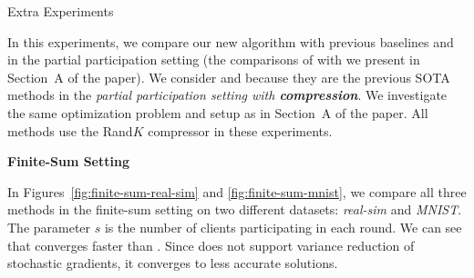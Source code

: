 \documentclass[10pt]{article}
\begin{document}
\begin{center}
    Extra Experiments
\end{center}

In this experiments, we compare our new algorithm  with previous baselines  and  in the partial participation setting (the comparisons of  with  we present in Section~A of the paper). We consider  and  because they are the previous SOTA methods in the \emph{partial participation setting with {\bf compression}}. We investigate the same optimization problem and setup as in Section~A of the paper. All methods use the Rand$K$ compressor in these experiments.

\begin{center}
    \bf Finite-Sum Setting
\end{center}
In Figures~\ref{fig:finite-sum-real-sim} and \ref{fig:finite-sum-mnist}, we compare all three methods in the finite-sum setting on two different datasets: \textit{real-sim} and \textit{MNIST}. The parameter $s$ is the number of clients participating in each round.
We can see that  converges faster than . Since  does not support variance reduction of stochastic gradients, it converges to less accurate solutions.
\end{document}
